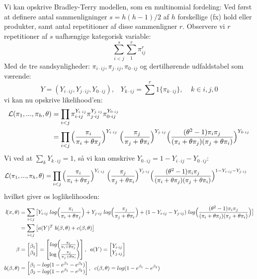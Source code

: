 \documentclass[11pt,a4paper]{article}
\begin{document}
\\\\
Vi kan opskrive Bradley-Terry modellen, som en multinomial fordeling: Ved først at definere antal sammenligninger $s=h(h-1)/2$ af $h$ forskellige (fx) hold eller produkter, samt antal repetitioner af disse sammenligner $r$. Observere vi $r$ repetitioner af $s$ uafhængige kategorisk variable: $$
\sum_{i<j}^s\sum_1^r\pi_{ij}^r
$$
Med de tre sandsynligheder: $\pi_{i\cdot ij},\pi_{j\cdot ij},\pi_{0\cdot ij}$
og dertilhørende udfaldstabel som værende:
$$
Y=(Y_{i\cdot ij},Y_{j\cdot ij},Y_{0\cdot ij}),\;\;\;Y_{k\cdot ij}=\sum^r1\{\pi_{k\cdot ij}\},\;\;\;\;k\in{i,j,0}
$$
vi kan nu opskrive likelihood'en:
\begin{align*}
\mathcal{L}(\pi_1,...,\pi_h,\theta) &= \prod_{i<j}\pi_{i\cdot ij}^{Y_{i\cdot ij}}\pi_{j\cdot ij}^{Y_{j\cdot ij}}\pi_{0\cdot ij}^{Y_{0\cdot ij}}\\
&= \prod_{i<j}\Big{(}\frac{\pi_i}{\pi_i+\theta\pi_j}\Big{)}^{Y_{i\cdot ij}}
\;\Big{(}\frac{\pi_j}{\pi_j+\theta\pi_i}\Big{)}^{Y_{j\cdot ij}}
\Big{(}\frac{(\theta^2-1)\pi_i \pi_j}{(\pi_i+\theta\pi_j)(\pi_j+\theta\pi_i)}\Big{)}^{Y_{0\cdot ij}}\\
\end{align*}
Vi ved at $\sum_k Y_{k\cdot ij}=1$, så vi kan omskrive $Y_{0\cdot ij}=1-Y_{i\cdot ij}-Y_{0\cdot ij}$: 
\begin{align}
\mathcal{L}(\pi_1,...,\pi_h,\theta)
&=\prod_{i<j}\Big{(}\frac{\pi_i}{\pi_i+\theta\pi_j}\Big{)}^{Y_{i\cdot ij}}
\;\Big{(}\frac{\pi_j}{\pi_j+\theta\pi_i}\Big{)}^{Y_{j\cdot ij}}
\Big{(}\frac{(\theta^2-1)\pi_i \pi_j}{(\pi_i+\theta\pi_j)(\pi_j+\theta\pi_i)}\Big{)}^{1-{Y_{i\cdot ij}}-{Y_{j\cdot ij}}}
\end{align}
hvilket giver os loglikelihooden: 
\begin{align*}
    \textit{l}(\pi,\theta)
    &=\sum_{i<j}\big{[}Y_{i\cdot ij}\;log\Big{(}\frac{\pi_i}{\pi_i+\theta\pi_j}\Big{)}
    + Y_{j\cdot ij}\;log\Big{(}\frac{\pi_j}{\pi_j+\theta\pi_i}\Big{)}
    + (1-Y_{i\cdot ij}-Y_{j\cdot ij})\;log\Big{(}\frac{(\theta^2-1)\pi_i \pi_j}{(\pi_i+\theta\pi_j)(\pi_j+\theta\pi_i)}\Big{)}\big{]}\\
    &=\sum_{i<j}\big{[}a(Y)^T\;b(\beta,\theta)+c(\beta,\theta)\big{]}\\
    \beta&=\begin{bmatrix}\beta_1\\ \beta_2\end{bmatrix}=\begin{bmatrix}log\Big{(}\frac{\pi_i}{\pi_i+\theta\pi_j}\Big{)}\\\log\Big{(}\frac{\pi_j}{\pi_j+\theta\pi_i}\Big{)} \end{bmatrix},\;\;
    a(Y)=\begin{bmatrix}Y_{i\cdot ij}\\Y_{j\cdot ij}\end{bmatrix}\;\; \\
    b(\beta,\theta)&=\begin{bmatrix}\beta_1-log(1-e^{\beta_1}-e^{\beta_2})\\\beta_2-log(1-e^{\beta_1}-e^{\beta_2})\end{bmatrix},\;\;
     c(\beta,\theta)=log(1-e^{\beta_1}-e^{\beta_2})
\end{align*}
\end{document}
